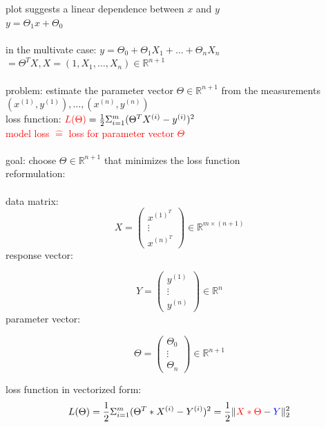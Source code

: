 	plot suggests a linear dependence between $x$ and $y$ \\
	$y = \Theta_1 x + \Theta_0$\\\\
	in the multivate case: $y = \Theta_0 + \Theta_1 X_1 + \dots + \Theta_n X_n$\\
	$= \Theta^T X, X = (1, X_1, \dots ,X_n ) \in \mathbb{R}^{n+1}$\\\\
	
	 problem: estimate the parameter vector $\Theta \in \mathbb{R}^{n+1}$ from the measurements $(x^{(1)}, y^{(1)}), \dots , (x^{(n)}, y^{(n)})$\\
	loss function: $\textcolor{red}{L(\Theta)} = \frac{1}{2} \Sigma^m_{i=1} (\Theta^T X^{(i)} - y^{(i)})^2$\\
	\textcolor{red}{model loss $\hat{=}$ loss for parameter vector $\Theta$}\\\\
	goal: choose $\Theta \in \mathbb{R}^{n+1}$ that minimizes the loss function\\
	reformulation:\\\\
	data matrix:
	\[ X =\left( \begin{array}{ccc}
	x^{(1)^T} \\
	\vdots \\
	x^{(n)^T} \end{array} \right) \in \mathbb{R}^{m \times (n+1)}\]
	response vector:
	
	\[ Y =\left( \begin{array}{ccc}
	y^{(1)} \\
	\vdots \\
	y^{(n)} \end{array} \right) \in \mathbb{R}^n\]
	parameter vector:
	
	\[ \Theta =\left( \begin{array}{ccc}
	\Theta_0 \\
	\vdots \\
	\Theta_n \end{array} \right) \in \mathbb{R}^{n+1}\]

	loss function in vectorized form:
	\[L(\Theta) = \frac{1}{2} \Sigma^m_{i=1} (\Theta^T * X^{(i)} - Y^{(i)})^2 = \frac{1}{2} \lVert \textcolor{red}{X * \Theta} - \textcolor{blue}{Y} \lVert^2_2\]
	

